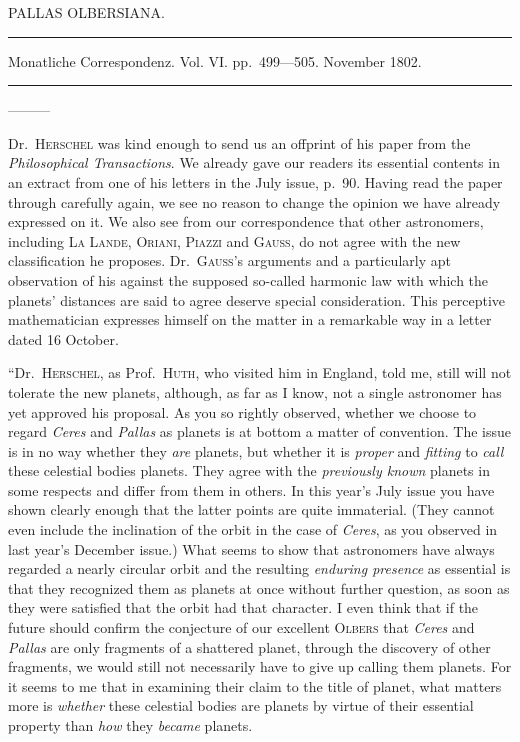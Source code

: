 \bigskip{}
\begin{center}
PALLAS OLBERSIANA.\par
\medskip\hrule\medskip
Monatliche Correspondenz. Vol. VI. pp.\ 499—505. November 1802.\par
\medskip\hrule
\end{center}\medskip
—\quad —\quad —

Dr.\ \textsc{Herschel} was kind enough to send us an offprint of his paper from the \textit{Philosophical Transactions}. We already gave our readers its essential contents in an extract from one of his letters in the July issue, p.\ 90. Having read the paper through carefully again, we see no reason to change the opinion we have already expressed on it. We also see from our correspondence that other astronomers, including \textsc{La Lande}, \textsc{Oriani}, \textsc{Piazzi} and \textsc{Gauss}, do not agree with the new classification he proposes. Dr.\ \textsc{Gauss}’s arguments and a particularly apt observation of his against the supposed so-called harmonic law with which the planets’ distances are said to agree deserve special consideration. This perceptive mathematician expresses himself on the matter in a remarkable way in a letter dated 16 October.

“Dr.\ \textsc{Herschel}, as Prof.\ \textsc{Huth}, who visited him in England, told me, still will not tolerate the new planets, although, as far as I know, not a single astronomer has yet approved his proposal. As you so rightly observed, whether we choose to regard \textit{Ceres} and \textit{Pallas} as planets is at bottom a matter of convention. The issue is in no way whether they \textit{are} planets, but whether it is \textit{proper} and \textit{fitting} to \textit{call} these celestial bodies planets. They agree with the \textit{previously known} planets in some respects and differ from them in others. In this year’s July issue you have shown clearly enough that the latter points are quite immaterial. (They cannot even include the inclination of the orbit in the case of \textit{Ceres}, as you observed in last year’s December issue.) What seems to show that astronomers have always regarded a nearly circular orbit and the resulting \textit{enduring presence} as essential is that
%
they recognized them as planets at once without further question, as soon as they were satisfied that the orbit had that character. I even think that if the future should confirm the conjecture of our excellent \textsc{Olbers} that \textit{Ceres} and \textit{Pallas} are only fragments of a shattered planet, through the discovery of other fragments, we would still not necessarily have to give up calling them planets. For it seems to me that in examining their claim to the title of planet, what matters more is \textit{whether} these celestial bodies are planets by virtue of their essential property than \textit{how} they \textit{became} planets.

